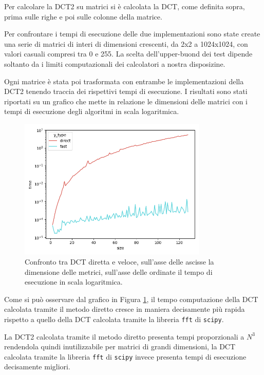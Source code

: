 \documentclass[a4paper, 12pt]{article}
\begin{document}
Per calcolare la DCT2 su matrici si è calcolata la DCT, come definita sopra, prima
sulle righe e poi sulle colonne della matrice.

Per confrontare i tempi di esecuzione delle due implementazioni sono state
create una serie di matrici di interi di dimensioni crescenti, da 2x2 a
1024x1024, con valori casuali compresi tra 0 e 255. La scelta dell'upper-buond
dei test dipende soltanto da i limiti computazionali dei calcolatori a nostra
disposizine.

Ogni matrice è stata poi trasformata con entrambe le implementazioni della DCT2
tenendo traccia dei rispettivi tempi di esecuzione. I risultati sono stati
riportati su un grafico che mette in relazione le dimensioni delle matrici con i
tempi di esecuzione degli algoritmi in scala logaritmica.

\begin{figure}[H]
  \centering
  \includegraphics[width=0.8\textwidth]{../test/benchmark-results/bench-incremental-0.png}
  \caption{Confronto tra DCT diretta e veloce, sull'asse delle ascisse la
    dimensione delle metrici, sull'asse delle ordinate il tempo di esecuzione in
    scala logaritmica.}
  \label{fig:incremental-benchmark}
\end{figure}

Come si può osservare dal grafico in Figura
\ref{fig:incremental-benchmark}, il tempo computazione della DCT calcolata
tramite il metodo diretto cresce in maniera decisamente più rapida rispetto a
quello della DCT calcolata tramite la libreria \texttt{fft} di \texttt{scipy}.

La DCT2 calcolata tramite il metodo diretto presenta tempi proporzionali a $N^3$
rendendola quindi inutilizzabile per matrici di grandi dimensioni, la DCT calcolata
tramite la libreria \texttt{fft} di \texttt{scipy} invece presenta tempi di esecuzione 
decisamente migliori.
\end{document}

